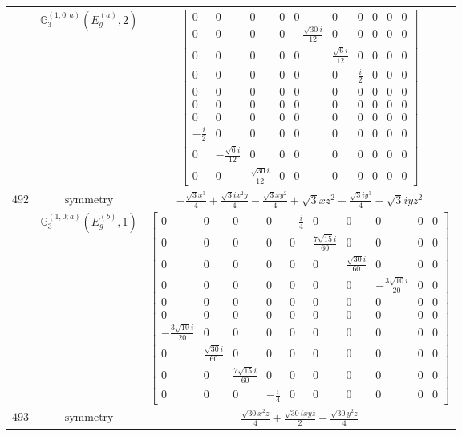 \documentclass[fleqn,8pt,landscape]{jsarticle}
\begin{document}
\begin{longtable}{ccc}
$  $ & $ \mathbb{G}_{3}^{(1,0;a)}(E_{g}^{(a)},2) $ & $ \begin{bmatrix} 0 & 0 & 0 & 0 & 0 & 0 & 0 & 0 & 0 & 0 \\ 0 & 0 & 0 & 0 & - \frac{\sqrt{30} i}{12} & 0 & 0 & 0 & 0 & 0 \\ 0 & 0 & 0 & 0 & 0 & \frac{\sqrt{6} i}{12} & 0 & 0 & 0 & 0 \\ 0 & 0 & 0 & 0 & 0 & 0 & \frac{i}{2} & 0 & 0 & 0 \\ 0 & 0 & 0 & 0 & 0 & 0 & 0 & 0 & 0 & 0 \\ 0 & 0 & 0 & 0 & 0 & 0 & 0 & 0 & 0 & 0 \\ 0 & 0 & 0 & 0 & 0 & 0 & 0 & 0 & 0 & 0 \\ - \frac{i}{2} & 0 & 0 & 0 & 0 & 0 & 0 & 0 & 0 & 0 \\ 0 & - \frac{\sqrt{6} i}{12} & 0 & 0 & 0 & 0 & 0 & 0 & 0 & 0 \\ 0 & 0 & \frac{\sqrt{30} i}{12} & 0 & 0 & 0 & 0 & 0 & 0 & 0 \end{bmatrix} $ \\ \hline
$ 492 $ & $ \text{symmetry} $ & $ - \frac{\sqrt{3} x^{3}}{4} + \frac{\sqrt{3} i x^{2} y}{4} - \frac{\sqrt{3} x y^{2}}{4} + \sqrt{3} x z^{2} + \frac{\sqrt{3} i y^{3}}{4} - \sqrt{3} i y z^{2} $ \\
$  $ & $ \mathbb{G}_{3}^{(1,0;a)}(E_{g}^{(b)},1) $ & $ \begin{bmatrix} 0 & 0 & 0 & 0 & - \frac{i}{4} & 0 & 0 & 0 & 0 & 0 \\ 0 & 0 & 0 & 0 & 0 & \frac{7 \sqrt{15} i}{60} & 0 & 0 & 0 & 0 \\ 0 & 0 & 0 & 0 & 0 & 0 & \frac{\sqrt{30} i}{60} & 0 & 0 & 0 \\ 0 & 0 & 0 & 0 & 0 & 0 & 0 & - \frac{3 \sqrt{10} i}{20} & 0 & 0 \\ 0 & 0 & 0 & 0 & 0 & 0 & 0 & 0 & 0 & 0 \\ 0 & 0 & 0 & 0 & 0 & 0 & 0 & 0 & 0 & 0 \\ - \frac{3 \sqrt{10} i}{20} & 0 & 0 & 0 & 0 & 0 & 0 & 0 & 0 & 0 \\ 0 & \frac{\sqrt{30} i}{60} & 0 & 0 & 0 & 0 & 0 & 0 & 0 & 0 \\ 0 & 0 & \frac{7 \sqrt{15} i}{60} & 0 & 0 & 0 & 0 & 0 & 0 & 0 \\ 0 & 0 & 0 & - \frac{i}{4} & 0 & 0 & 0 & 0 & 0 & 0 \end{bmatrix} $ \\ \hline
$ 493 $ & $ \text{symmetry} $ & $ \frac{\sqrt{30} x^{2} z}{4} + \frac{\sqrt{30} i x y z}{2} - \frac{\sqrt{30} y^{2} z}{4} $ \\

\end{longtable}
\end{document}
